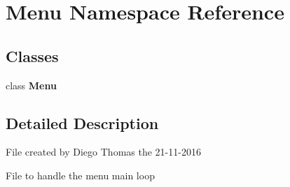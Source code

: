 \section{Menu Namespace Reference}
\label{namespace_menu}
\subsection*{Classes}
\begin{DoxyCompactItemize}
\item 
class \textbf{ Menu}
\end{DoxyCompactItemize}


\subsection{Detailed Description}
\begin{DoxyVerb}File created by Diego Thomas the 21-11-2016

File to handle the menu main loop
\end{DoxyVerb}
 